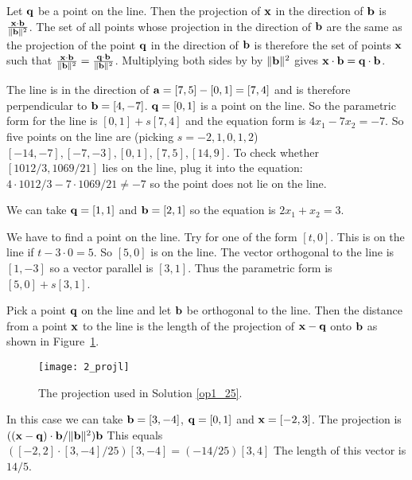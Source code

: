 \vspace{2mm}
Let $\qq$ be a point on the line. Then the projection of $\xx$ in the direction
of $\bb$ is ${{\xx\cdot\bb}\over{\|\bb\|^2}}$. The set of all points whose
projection in the direction of $\bb$ are the same as the projection of the point
$\qq$ in the direction of $\bb$ is therefore the set of points $\xx$ such that
${{\xx\cdot\bb}\over{\|\bb\|^2}}={{\qq\cdot\bb}\over{\|\bb\|^2}}$. Multiplying
both sides by by $\|\bb\|^2$ gives $\xx\cdot\bb=\qq\cdot\bb$.

\vspace{2mm}
The line is in the direction of $\aa=[7,5]-[0,1]=[7,4]$ and is therefore
perpendicular to $\bb=[4,-7]$. $\qq=[0,1]$ is a point on the line. So the
parametric form for the line is $[0,1]+s[7,4]$ and the equation form is
$4x_1-7x_2=-7$. So five points on the line are (picking $s=-2,1,0,1,2$)
$[-14,-7],[-7,-3],[0,1],[7,5],[14,9]$. To check whether $[1012/3,1069/21]$ lies
on the line, plug it into the equation: $4\cdot 1012/3-7\cdot 1069/21 \ne -7$
so the point does not lie on the line.

\vspace{2mm}
We can take $\qq=[1,1]$ and $\bb=[2,1]$ so the equation is $2x_1+x_2=3$.

\vspace{2mm}
We have to find a point on the line. Try for one of the form $[t,0]$. This
is on the line if $t-3\cdot 0=5$. So $[5,0]$ is on the line. The vector
orthogonal to the line is $[1,-3]$ so a vector parallel is $[3,1]$. Thus
the parametric form is $[5,0]+s[3,1]$.

\vspace{2mm}
Pick a point $\qq$ on the line and let $\bb$ be orthogonal to the line. Then
the distance from a point $\xx$ to the line is the length of the
projection of $\xx-\qq$ onto $\bb$ as shown in Figure~\ref{fig_projl}.
\begin{figure}
\centerline{\texttt{[image: 2\_projl]}}
\caption{The projection used in Solution \ref{op1_25}. \label{fig_projl}}
\end{figure}
In this case we can take $\bb=[3,-4]$, $\qq=[0,1]$ and $\xx=[-2,3]$. The
projection is $((\xx-\qq)\cdot\bb/\|\bb\|^2)\bb$ This equals
$([-2,2]\cdot[3,-4]/25)[3,-4]=(-14/25)[3,4]$ The length of this vector
is $14/5$.

